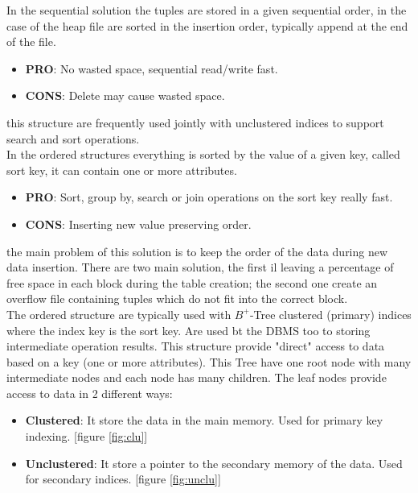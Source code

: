 \documentclass[12pt]{article}
\begin{document}
In the sequential solution the tuples are stored in a given sequential order, in the case of the heap file are sorted in the insertion order, typically append at the end of the file.
\begin{itemize}
  \item \textbf{PRO}: No wasted space, sequential read/write fast.
  \item \textbf{CONS}: Delete may cause wasted space.
\end{itemize}
this structure are frequently used jointly with unclustered indices to support search and sort operations.\\
In the ordered structures everything is sorted by the value of a given key, called sort key, it can contain one or more attributes.
\begin{itemize}
  \item \textbf{PRO}: Sort, group by, search or join operations on the sort key really fast.
  \item \textbf{CONS}: Inserting new value preserving order.
\end{itemize}
the main problem of this solution is to keep the order of the data during new data insertion. There are two main solution, the first il leaving a percentage of free space in each block during the table creation; the second one create an overflow file containing tuples which do not fit into the correct block.\\
The ordered structure are typically used with $B^{+}$-Tree clustered (primary) indices where the index key is the sort key. Are used bt the DBMS too to storing intermediate operation results. This structure provide "direct" access to data based on a key (one or more attributes). This Tree have one root node with many intermediate nodes and each node has many children. The leaf nodes provide access to data in 2 different ways:
\begin{itemize}
  \item \textbf{Clustered}: It store the data in the main memory. Used for primary key indexing. [figure \ref{fig:clu}]
  \item \textbf{Unclustered}: It store a pointer to the secondary memory of the data. Used for secondary indices. [figure \ref{fig:unclu}]
\end{itemize}
\end{document}
